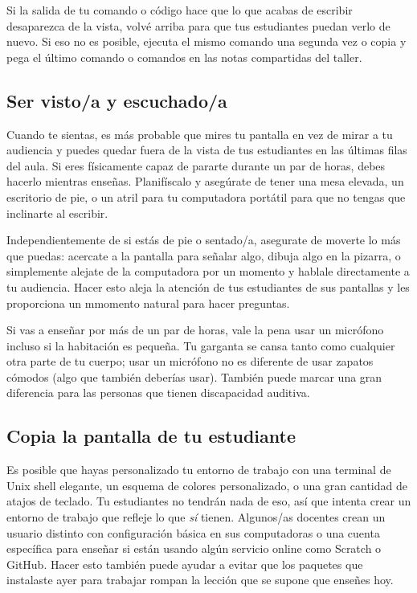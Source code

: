 Si la salida de tu comando o código hace que lo que acabas de escribir desaparezca de la vista,
volvé arriba para que tus estudiantes puedan verlo de nuevo.
Si eso no es posible,
ejecuta el mismo comando una segunda vez
o copia y pega el último comando o comandos en las notas compartidas del taller.

\subsection*{Ser visto/a y escuchado/a}

Cuando te sientas,
es más probable que mires tu pantalla en vez de mirar a tu audiencia
y puedes quedar fuera de la vista de tus estudiantes en las últimas filas del aula.
Si eres físicamente capaz de pararte durante un par de horas,
debes hacerlo mientras enseñas.
Planifíscalo y asegúrate de tener una mesa elevada, 
un escritorio de pie,
o un atril
para tu computadora portátil
para que no tengas que inclinarte al escribir.

Independientemente de si estás de pie o sentado/a,
asegurate de moverte lo más que puedas:
acercate a la pantalla para señalar algo,
dibuja algo en la pizarra,
o simplemente alejate de la computadora por un momento y hablale directamente a tu audiencia.
Hacer esto aleja la atención de tus estudiantes de sus pantallas
y les proporciona un mmomento natural para hacer preguntas.

Si vas a enseñar por más de un par de horas,
vale la pena usar un micrófono incluso si la habitación es pequeña.
Tu garganta se cansa tanto como cualquier otra parte de tu cuerpo;
usar un micrófono no es diferente de usar zapatos cómodos 
(algo que también deberías usar).
También puede marcar una gran diferencia para las personas que tienen discapacidad auditiva.

\subsection*{Copia la pantalla de tu estudiante}

Es posible que hayas personalizado tu entorno de trabajo con una terminal de Unix shell elegante,
un esquema de colores personalizado,
o una gran cantidad de atajos de teclado.
Tu estudiantes no tendrán nada de eso,
así que intenta crear un entorno de trabajo que refleje lo que \emph{sí} tienen.
Algunos/as docentes crean un usuario distinto con configuración básica en sus computadoras
o una cuenta específica para enseñar 
si están usando algún servicio online como Scratch o GitHub.
Hacer esto también puede ayudar a evitar que los paquetes que instalaste ayer para trabajar 
rompan la lección que se supone que enseñes hoy.

